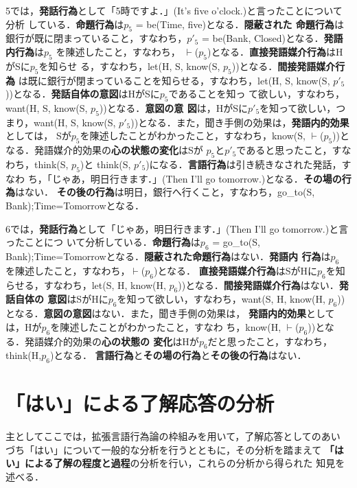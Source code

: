 5では，{\bf 発話行為}として「5時ですよ．」(It's five o'clock.)と言ったことについて分析
している．{\bf 命題行為}は$p_{5}$ = be(Time, five)となる．{\bf 隠蔽された
命題行為}は銀行が既に閉まっていること，すなわち，$p'_{5}$ = be(Bank,
Closed)となる．{\bf 発語内行為}は$p_{5}$ を陳述したこと，すなわち，
$\vdash$($p_{5}$)となる．{\bf 直接発語媒介行為}はHがSに$p_{5}$を知らせ
る，すなわち，let(H, S, know(S, $p_{5}$))となる．{\bf 間接発語媒介行為}
は既に銀行が閉まっていることを知らせる，すなわち，let(H, S, know(S,
$p'_{5}$))となる．{\bf 発話自体の意図}はHがSに$p_{5}$であることを知っ
て欲しい，すなわち，want(H, S, know(S, $p_{5}$))となる．{\bf 意図の意
図}は，HがSに$p'_{5}$を知って欲しい，つまり，want(H, S, know(S,
$p'_{5}$))となる．また，聞き手側の効果は，{\bf 発語内的効果}としては，
Sが$p_{5}$を陳述したことがわかったこと，すなわち，know(S,
$\vdash$($p_{5}$))となる．発語媒介的効果の{\bf 心の状態の変化}はSが
$p_{5}$と$p'_{5}$であると思ったこと，すなわち，think(S, $p_{5}$)と
think(S, $p'_{5}$)になる．{\bf 言語行為}は引き続きなされた発話，すなわ
ち，「じゃあ，明日行きます．」(Then I'll go tomorrow.)となる．{\bf その場の行為}はない．{\bf 
その後の行為}は明日，銀行へ行くこと，すなわち，go\_to(S,
Bank);Time=Tomorrowとなる．

6では，{\bf 発話行為}として「じゃあ，明日行きます．」(Then I'll go tomorrow.)と言ったことにつ
いて分析している．{\bf 命題行為}は$p_{6}$ = go\_to(S,
Bank);Time=Tomorrowとなる．{\bf 隠蔽された命題行為}はない．{\bf 発語内
行為}は$p_{6}$ を陳述したこと，すなわち，$\vdash$($p_{6}$)となる．{\bf 
直接発語媒介行為}はSがHに$p_{6}$を知らせる，すなわち，let(S, H,
know(H, $p_{6}$))となる．{\bf 間接発語媒介行為}はない．{\bf 発話自体の
意図}はSがHに$p_{6}$を知って欲しい，すなわち，want(S, H, know(H,
$p_{6}$))となる．{\bf 意図の意図}はない．また，聞き手側の効果は，{\bf 
発語内的効果}としては，Hが$p_{6}$を陳述したことがわかったこと，すなわ
ち，know(H, $\vdash$($p_{6}$))となる．発語媒介的効果の{\bf 心の状態の
変化}はHが$p_{6}$だと思ったこと，すなわち，think(H,$p_{6}$)となる．
{\bf 言語行為}と{\bf その場の行為}と{\bf その後の行為}はない．

\section{「はい」による了解応答の分析}

主としてここでは，拡張言語行為論の枠組みを用いて，了解応答としてのあい
づち「はい」について一般的な分析を行うとともに，その分析を踏まえて{\bf 
「はい」による了解の程度と過程}の分析を行い，これらの分析から得られた
知見を述べる．

